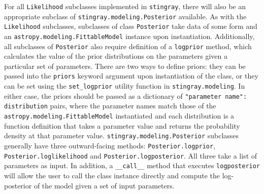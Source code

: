 \documentclass[12pt]{emulateapj}
\newcommand{\stingray}{\texttt{stingray}\xspace}
\newcommand{\likelihood}{\texttt{Likelihood}\xspace}
\begin{document}
For all \likelihood subclasses implemented in \stingray, there will also be an appropriate subclass of \verb|stingray.modeling.Posterior| available. As with the \likelihood subclasses, subclasses of class \verb|Posterior| take data of some form and an \verb|astropy.modeling.FittableModel| instance upon instantiation. Additionally, all subclasses of  \verb|Posterior| also require definition of a \texttt{logprior} method, which calculates the value of the prior distributions on the parameters given a particular set of parameters. There are two ways to define priors: they can be passed into the \texttt{priors} keyword argument upon instantiation of the class, or they can be set using the \verb|set_logprior| utility function in \verb|stingray.modeling|. In either case, the priors should be passed as a dictionary of \verb|"parameter name": distribution| pairs, where the parameter names match those of the \verb|astropy.modeling.FittableModel| instantiated and each distribution is a function definition that takes a parameter value and returns the probability density at that parameter value. \verb|stingray.modeling.Posterior| subclasses generally have three outward-facing methods: \verb|Posterior.logprior|, \verb|Posterior.loglikelihood| and \verb|Posterior.logposterior|. All three take a list of parameters as input. In addition, a \verb|__call__| method that executes \verb|logposterior| will allow the user to call the class instance directly and compute the log-posterior of the model given a set of input parameters. 
\end{document}
